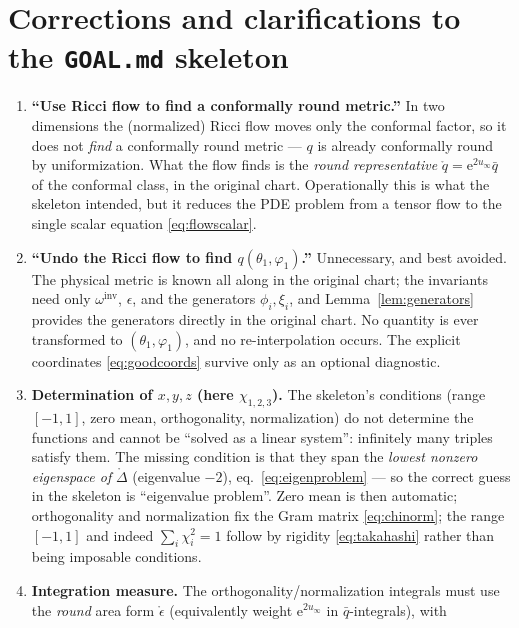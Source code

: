 \documentclass[11pt]{article}
\newcommand{\ee}{\mathrm{e}}
\newcommand{\qo}{\mathring{q}}          %
\newcommand{\epso}{\mathring{\epsilon}} %
\newcommand{\Lapo}{\mathring{\Delta}}   %
\begin{document}
\appendix
\section{Corrections and clarifications to the \texttt{GOAL.md} skeleton}
\label{app:corrections}

\begin{enumerate}
\item \textbf{``Use Ricci flow to find a conformally round metric.''}
  In two dimensions the (normalized) Ricci flow moves only the conformal
  factor, so it does not \emph{find} a conformally round metric --- $q$ is
  already conformally round by uniformization.  What the flow finds is the
  \emph{round representative} $\qo = \ee^{2u_\infty}\bar q$ of the conformal
  class, in the original chart.  Operationally this is what the skeleton
  intended, but it reduces the PDE problem from a tensor flow to the single
  scalar equation \eqref{eq:flowscalar}.
\item \textbf{``Undo the Ricci flow to find $q(\theta_1,\varphi_1)$.''}
  Unnecessary, and best avoided.  The physical metric is known all along in
  the original chart; the invariants need only $\omega^{\mathrm{inv}}$,
  $\epsilon$, and the generators $\phi_i,\xi_i$, and
  Lemma~\ref{lem:generators} provides the generators directly in the
  original chart.  No quantity is ever transformed to
  $(\theta_1,\varphi_1)$, and no re-interpolation occurs.  The explicit
  coordinates \eqref{eq:goodcoords} survive only as an optional diagnostic.
\item \textbf{Determination of $x,y,z$ (here $\chi_{1,2,3}$).}  The
  skeleton's conditions (range $[-1,1]$, zero mean, orthogonality,
  normalization) do not determine the functions and cannot be ``solved as a
  linear system'': infinitely many triples satisfy them.  The missing
  condition is that they span the \emph{lowest nonzero eigenspace of}
  $\Lapo$ (eigenvalue $-2$), eq.~\eqref{eq:eigenproblem} --- so the correct
  guess in the skeleton is ``eigenvalue problem''.  Zero mean is then
  automatic; orthogonality and normalization fix the Gram matrix
  \eqref{eq:chinorm}; the range $[-1,1]$ and indeed
  $\sum_i\chi_i^2 = 1$ follow by rigidity \eqref{eq:takahashi} rather than
  being imposable conditions.
\item \textbf{Integration measure.}  The orthogonality/normalization
  integrals must use the \emph{round} area form $\epso$ (equivalently weight
  $\ee^{2u_\infty}$ in $\bar q$-integrals), with

\end{enumerate}
\end{document}
